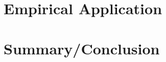 \documentclass[12pt]{article}
\begin{document}
\section{Empirical Application}
\section{Summary/Conclusion}
\newpage


\appendix


\newpage
\end{document}
